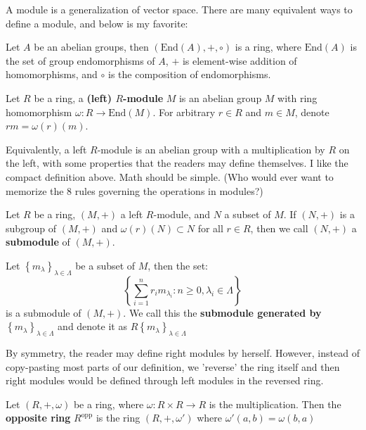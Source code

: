 \documentclass{note-eng}
\begin{document}
A module is a generalization of vector space. There are many equivalent ways to define a module, and below is my favorite:

\begin{proposition}
    Let $A$ be an abelian groups, then $(\mathrm{End}(A), +, \circ)$ is a ring, where $\mathrm{End}(A)$ is the set of group endomorphisms of $A$, $+$ is element-wise addition of homomorphisms, and $\circ$ is the composition of endomorphisms.
\end{proposition}

\begin{definition}
    Let $R$ be a ring, a \textbf{(left) $R$-module} $M$ is an abelian group $M$ with ring homomorphism $\omega: R \rightarrow \mathrm{End}(M)$. For arbitrary $r \in R$ and $m \in M$, denote $rm = \omega(r)(m)$.
\end{definition}

Equivalently, a left $R$-module is an abelian group with a multiplication by $R$ on the left, with some properties that the readers may define themselves. I like the compact definition above. Math should be simple. (Who would ever want to memorize the 8 rules governing the operations in modules?)

\begin{definition}[Submodule]
    Let $R$ be a ring, $(M, +)$ a left $R$-module, and $N$ a subset of $M$. If $(N, +)$ is a subgroup of $(M, +)$ and $\omega(r)(N) \subset N$ for all $r \in R$, then we call $(N, +)$ a \textbf{submodule} of $(M, +)$.
\end{definition}

\begin{example}
    Let $\left\lbrace m_{\lambda} \right\rbrace_{\lambda \in \Lambda}$ be a subset of $M$, then the set:
    $$\left\lbrace \sum\limits_{i = 1}^{n} r_i m_{\lambda_i}: n \ge 0, \lambda_i \in \Lambda  \right\rbrace$$
    is a submodule of $(M, +)$. We call this the \textbf{submodule generated by $\left\lbrace m_{\lambda} \right\rbrace_{\lambda \in \Lambda}$} and denote it as $R \left\lbrace m_\lambda \right\rbrace_{\lambda \in \Lambda}$
\end{example}

By symmetry, the reader may define right modules by herself. However, instead of copy-pasting most parts of our definition, we 'reverse' the ring itself and then right modules would be defined through left modules in the reversed ring.

\begin{definition}
    Let $(R, +, \omega)$ be a ring, where $\omega: R \times R \rightarrow R$ is the multiplication. Then the \textbf{opposite ring} $R ^\mathrm{opp}$ is the ring $(R, +, \omega')$ where $\omega'(a, b) = \omega(b, a)$
\end{definition}
\end{document}
